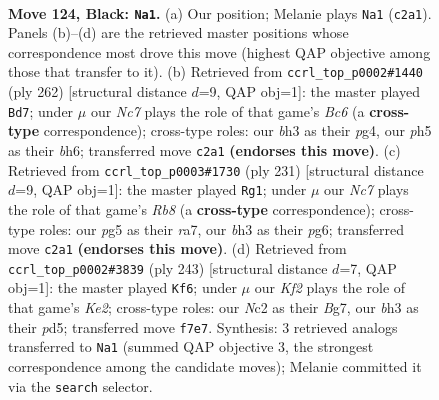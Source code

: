 \documentclass[11pt]{article}
\begin{document}
\clearpage

\begin{figure}[p]\centering
\begin{subfigure}{0.46\textwidth}\centering
\resizebox{\linewidth}{!}{%
\newchessgame
\chessboard[
  setfen={8/5k2/8/6PP/8/7B/2n4K/8 b - - 18 124},
  showmover=false,
  pgfstyle=straightmove, color=movearrow, markmove={c2-a1}
]}
\caption{}
\end{subfigure}\hfill
\begin{subfigure}{0.46\textwidth}\centering
\resizebox{\linewidth}{!}{%
\newchessgame
\chessboard[
  setfen={8/8/2B4b/8/3p2p1/7k/4K3/8 w - - 56 132},
  showmover=false,
  pgfstyle=straightmove, color=movearrow, markmove={c6-d7}
]}
\caption{}
\end{subfigure}
\\[4pt]
\begin{subfigure}{0.46\textwidth}\centering
\resizebox{\linewidth}{!}{%
\newchessgame
\chessboard[
  setfen={6k1/R7/6P1/6K1/8/6P1/8/1r6 b - - 2 116},
  showmover=false,
  pgfstyle=straightmove, color=movearrow, markmove={b1-g1}
]}
\caption{}
\end{subfigure}\hfill
\begin{subfigure}{0.46\textwidth}\centering
\resizebox{\linewidth}{!}{%
\newchessgame
\chessboard[
  setfen={8/4k1b1/6P1/3P4/4K1B1/8/8/8 b - - 4 122},
  showmover=false,
  pgfstyle=straightmove, color=movearrow, markmove={e7-f6}
]}
\caption{}
\end{subfigure}
\caption{\textbf{Move 124, Black: \texttt{Na1}.} (a) Our position; Melanie plays \texttt{Na1} (\texttt{c2a1}). Panels (b)--(d) are the retrieved master positions whose correspondence most drove this move (highest QAP objective among those that transfer to it). (b) Retrieved from \texttt{ccrl\_top\_p0002\#1440} (ply 262) [structural distance $d$=9, QAP obj=1]: the master played \texttt{Bd7}; under $\mu$ our \emph{Nc7} plays the role of that game's \emph{Bc6} (a \textbf{cross-type} correspondence); cross-type roles: our \emph{b}h3 as their \emph{p}g4, our \emph{p}h5 as their \emph{b}h6; transferred move \texttt{c2a1} \textbf{(endorses this move)}. (c) Retrieved from \texttt{ccrl\_top\_p0003\#1730} (ply 231) [structural distance $d$=9, QAP obj=1]: the master played \texttt{Rg1}; under $\mu$ our \emph{Nc7} plays the role of that game's \emph{Rb8} (a \textbf{cross-type} correspondence); cross-type roles: our \emph{p}g5 as their \emph{r}a7, our \emph{b}h3 as their \emph{p}g6; transferred move \texttt{c2a1} \textbf{(endorses this move)}. (d) Retrieved from \texttt{ccrl\_top\_p0002\#3839} (ply 243) [structural distance $d$=7, QAP obj=1]: the master played \texttt{Kf6}; under $\mu$ our \emph{Kf2} plays the role of that game's \emph{Ke2}; cross-type roles: our \emph{N}c2 as their \emph{B}g7, our \emph{b}h3 as their \emph{p}d5; transferred move \texttt{f7e7}. Synthesis: 3 retrieved analogs transferred to \texttt{Na1} (summed QAP objective 3, the strongest correspondence among the candidate moves); Melanie committed it via the \texttt{search} selector.}
\label{fig:thought-m247}
\end{figure}
\end{document}
